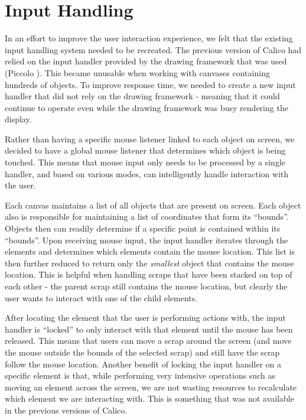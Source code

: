 \section{Input Handling}
In an effort to improve the user interaction experience, we felt that the existing input handling system needed to be recreated. The previous version of Calico had relied on the input handler provided by the drawing framework that was used (Piccolo \cite{piccolo}). This became unusable when working with canvases containing hundreds of objects. To improve response time, we needed to create a new input handler that did not rely on the drawing framework - meaning that it could continue to operate even while the drawing framework was busy rendering the display.

Rather than having a specific mouse listener linked to each object on screen, we decided to have a global mouse listener that determines which object is being touched. This means that mouse input only needs to be processed by a single handler, and based on various modes, can intelligently handle interaction with the user. 

Each canvas maintains a list of all objects that are present on screen. Each object also is responsible for maintaining a list of coordinates that form its ``bounds''. Objects then can readily determine if a specific point is contained within its ``bounds''.
Upon receiving mouse input, the input handler iterates through the elements and determines which elements contain the mouse location. This list is then further reduced to return only the \emph{smallest} object that contains the mouse location. This is helpful when handling scraps that have been stacked on top of each other - the parent scrap still contains the mouse location, but clearly the user wants to interact with one of the child elements.

After locating the element that the user is performing actions with, the input handler is ``locked'' to only interact with that element until the mouse has been released. This means that users can move a scrap around the screen (and move the mouse outside the bounds of the selected scrap) and still have the scrap follow the mouse location. Another benefit of locking the input handler on a specific element is that, while performing very intensive operations such as moving an element across the screen, we are not wasting resources to recalculate which element we are interacting with. This is something that was not available in the previous versions of Calico.

